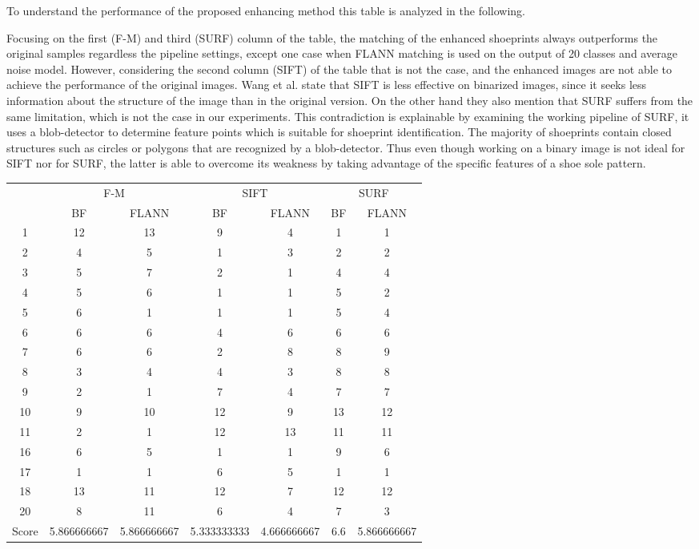\documentclass[draft,final]{vutinfth} %
\begin{document}
To understand the performance of the proposed enhancing method this table is analyzed in the following.
\par
Focusing on the first (F-M) and third (SURF) column of the table, the matching of the enhanced shoeprints always outperforms the original samples regardless the pipeline settings, except one case when FLANN matching is used on the output of 20 classes and average noise model.
However, considering the second column (SIFT) of the table that is not the case, and the enhanced images are not able to achieve the performance of the original images.
Wang et al. \cite{wang2017manifold} state that SIFT is less effective on binarized images, since it seeks less information about the structure of the image than in the original version.
On the other hand they also mention that SURF suffers from the same limitation, which is not the case in our experiments.
This contradiction is explainable by examining the working pipeline of SURF, it uses a blob-detector to determine feature points which is suitable for shoeprint identification.
The majority of shoeprints contain closed structures such as circles or polygons that are recognized by a blob-detector.
Thus even though working on a binary image is not ideal for SIFT nor for SURF, the latter is able to overcome its weakness by taking advantage of the specific features of a shoe sole pattern.

\begin{minipage}{\linewidth}
\centering
\begin{tabular}{ccccccc}
& \multicolumn{2}{c}{ F-M } & \multicolumn{2}{c}{ SIFT } & \multicolumn{2}{c}{ SURF } \\
& BF & FLANN & BF & FLANN & BF & FLANN \\
1 & 12 & 13 & 9 & 4 & 1 & 1 \\
2 & 4 & 5 & 1 & 3 & 2 & 2 \\
3 & 5 & 7 & 2 & 1 & 4 & 4 \\
4 & 5 & 6 & 1 & 1 & 5 & 2 \\
5 & 6 & 1 & 1 & 1 & 5 & 4 \\
6 & 6 & 6 & 4 & 6 & 6 & 6 \\
7 & 6 & 6 & 2 & 8 & 8 & 9 \\
8 & 3 & 4 & 4 & 3 & 8 & 8 \\
9 & 2 & 1 & 7 & 4 & 7 & 7 \\
10 & 9 & 10 & 12 & 9 & 13 & 12 \\
11 & 2 & 1 & 12 & 13 & 11 & 11 \\
16 & 6 & 5 & 1 & 1 & 9 & 6 \\
17 & 1 & 1 & 6 & 5 & 1 & 1 \\
18 & 13 & 11 & 12 & 7 & 12 & 12 \\
20 & 8 & 11 & 6 & 4 & 7 & 3 \\
Score & 5.866666667 & 5.866666667 & 5.333333333 & 4.666666667 & 6.6 & 5.866666667 \\
\end{tabular}
 \label{tab:BL} 
\end{minipage}
\end{document}

